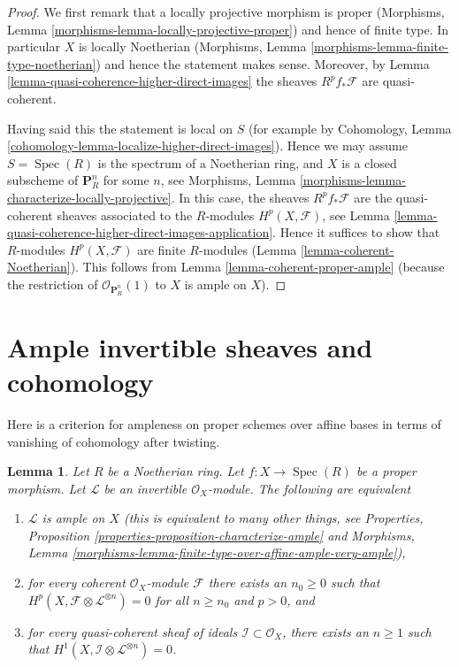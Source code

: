 \documentclass{stacks-project}
\newenvironment{reference}{\comment}{\endcomment}
\theoremstyle{plain}
\newtheorem{lemma}[subsection]{Lemma}
\theoremstyle{definition}
\theoremstyle{remark}
\numberwithin{equation}{subsection}
\def\Spec{\mathop{\mathrm{Spec}}}
\begin{document}
\begin{proof}
We first remark that a locally projective morphism is proper
(Morphisms, Lemma \ref{morphisms-lemma-locally-projective-proper})
and hence of finite type.
In particular $X$ is locally Noetherian
(Morphisms, Lemma \ref{morphisms-lemma-finite-type-noetherian})
and hence the statement makes sense.
Moreover, by Lemma \ref{lemma-quasi-coherence-higher-direct-images}
the sheaves $R^pf_*\mathcal{F}$ are quasi-coherent.

\medskip\noindent
Having said this the statement is local on $S$ (for example by
Cohomology, Lemma \ref{cohomology-lemma-localize-higher-direct-images}).
Hence we may assume $S = \Spec(R)$ is the spectrum of
a Noetherian ring, and $X$ is a closed subscheme of
$\mathbf{P}^n_R$ for some $n$, see
Morphisms, Lemma \ref{morphisms-lemma-characterize-locally-projective}.
In this case, the sheaves $R^pf_*\mathcal{F}$ are the quasi-coherent
sheaves associated to the $R$-modules $H^p(X, \mathcal{F})$, see
Lemma \ref{lemma-quasi-coherence-higher-direct-images-application}.
Hence it suffices to show that $R$-modules $H^p(X, \mathcal{F})$
are finite $R$-modules (Lemma \ref{lemma-coherent-Noetherian}).
This follows from Lemma \ref{lemma-coherent-proper-ample}
(because the restriction of $\mathcal{O}_{\mathbf{P}^n_R}(1)$
to $X$ is ample on $X$).
\end{proof}








\section{Ample invertible sheaves and cohomology}
\label{section-ample-cohomology}

\noindent
Here is a criterion for ampleness on proper schemes over affine bases
in terms of vanishing of cohomology after twisting.

\begin{lemma}
\label{lemma-vanshing-gives-ample}
\begin{reference}
\cite[III Proposition 2.6.1]{EGA}
\end{reference}
Let $R$ be a Noetherian ring. Let $f : X \to \Spec(R)$ be a proper morphism.
Let $\mathcal{L}$ be an invertible $\mathcal{O}_X$-module.
The following are equivalent
\begin{enumerate}
\item $\mathcal{L}$ is ample on $X$ (this is equivalent to many other
things, see
Properties, Proposition \ref{properties-proposition-characterize-ample} and
Morphisms, Lemma
\ref{morphisms-lemma-finite-type-over-affine-ample-very-ample}),
\item for every coherent $\mathcal{O}_X$-module $\mathcal{F}$ there exists
an $n_0 \geq 0$ such that
$H^p(X, \mathcal{F} \otimes \mathcal{L}^{\otimes n}) = 0$ for all $n \geq n_0$
and $p > 0$, and
\item for every quasi-coherent sheaf of ideals
$\mathcal{I} \subset \mathcal{O}_X$, there exists an $n \geq 1$
such that $H^1(X, \mathcal{I} \otimes \mathcal{L}^{\otimes n}) = 0$.
\end{enumerate}
\end{lemma}
\end{document}
